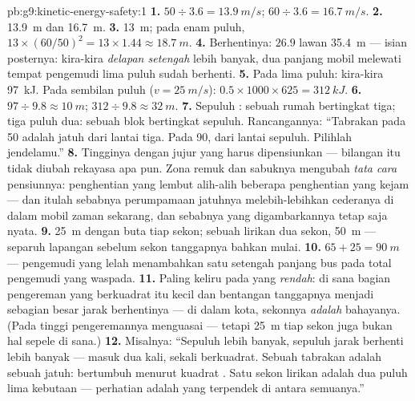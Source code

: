 \begin{solution}{pb:g9:kinetic-energy-safety:1}
\textbf{1.} $50 \div 3.6 = \qty{13.9}{m/s}$; $60 \div 3.6 =
\qty{16.7}{m/s}$.
\textbf{2.} \qty{13.9}{m} dan \qty{16.7}{m}.
\textbf{3.} \qty{13}{m}; pada enam puluh, $13 \times (60/50)^2 =
13 \times 1.44 \approx \qty{18.7}{m}$.
\textbf{4.} Berhentinya: $26.9$ lawan \qty{35.4}{m} --- isian
posternya: kira-kira \emph{delapan setengah } lebih banyak, dua
panjang mobil melewati tempat pengemudi lima puluh sudah berhenti.
\textbf{5.} Pada lima puluh: kira-kira \qty{97}{kJ}. Pada sembilan
puluh ($v =
\qty{25}{m/s}$): $0.5 \times 1000 \times 625 =
\qty{312}{kJ}$.
\textbf{6.} $97 \div 9.8 \approx \qty{10}{m}$; $312 \div 9.8
\approx \qty{32}{m}$.
\textbf{7.} Sepuluh : sebuah rumah bertingkat tiga; tiga puluh
dua: sebuah blok bertingkat sepuluh. Rancangannya: ``Tabrakan pada 50
adalah jatuh dari lantai tiga. Pada 90, dari lantai sepuluh. Pilihlah
jendelamu.''
\textbf{8.} Tingginya dengan jujur   yang harus
dipensiunkan --- bilangan itu tidak diubah rekayasa apa pun. Zona
remuk dan sabuknya mengubah \emph{tata cara} pensiunnya: 
penghentian yang lembut alih-alih beberapa  penghentian yang
kejam --- dan itulah sebabnya perumpamaan jatuhnya melebih-lebihkan
cederanya di dalam mobil zaman sekarang, dan sebabnya  yang
digambarkannya tetap saja nyata.
\textbf{9.} \qty{25}{m} dengan buta tiap sekon; sebuah lirikan dua
sekon, \qty{50}{m} --- separuh lapangan sebelum sekon tanggapnya
bahkan mulai.
\textbf{10.} $65 + 25 = \qty{90}{m}$ --- pengemudi yang lelah
menambahkan satu setengah panjang bus pada total pengemudi yang
waspada.
\textbf{11.} Paling keliru pada  yang \emph{rendah}: di sana
bagian pengereman yang berkuadrat itu kecil dan bentangan tanggapnya
menjadi sebagian besar jarak berhentinya --- di dalam kota, sekonnya
\emph{adalah} bahayanya. (Pada  tinggi pengeremannya menguasai
--- tetapi \qty{25}{m} tiap sekon juga bukan hal sepele di sana.)
\textbf{12.} Misalnya: ``Sepuluh   lebih banyak, sepuluh
 jarak berhenti lebih banyak ---  masuk dua kali, sekali
berkuadrat. Sebuah tabrakan adalah sebuah jatuh:  bertumbuh
menurut kuadrat . Satu sekon lirikan adalah dua puluh lima
 kebutaan --- perhatian adalah  yang terpendek di
antara semuanya.''
\end{solution}
